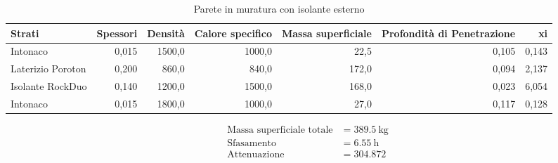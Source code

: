\begin{table}
\centering
\caption{Parete in muratura con isolante esterno}
\begin{tabular}{lrrrrrr}
\toprule
            Strati & Spessori & Densità & Calore specifico & Massa superficiale & Profondità di Penetrazione &     xi \\
\midrule
          Intonaco &    0,015 &  1500,0 &           1000,0 &               22,5 &                      0,105 &  0,143 \\
 Laterizio Poroton &    0,200 &   860,0 &            840,0 &              172,0 &                      0,094 &  2,137 \\
  Isolante RockDuo &    0,140 &  1200,0 &           1500,0 &              168,0 &                      0,023 &  6,054 \\
          Intonaco &    0,015 &  1800,0 &           1000,0 &               27,0 &                      0,117 &  0,128 \\
\bottomrule
\end{tabular}
\end{table}

\begin{flushleft}
\begin{align*}
\text{Massa superficiale totale} &= \SI{389.5}{\kilo\gram}\\
\text{Sfasamento} &= \SI{6.55}{\hour}\\
\text{Attenuazione} &= \SI{304.872}{}
\end{align*}
\end{flushleft}
